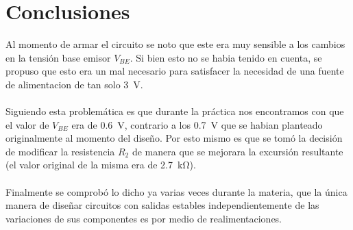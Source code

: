 \documentclass[a4paper,12pt]{article}
\newcommand{\mR}[1]{\SI{#1}{\kilo\ohm}}
\newcommand{\mV}[1]{\SI{#1}{\volt}}
\begin{document}
\section{Conclusiones}
    Al momento de armar el circuito se noto que este era muy sensible a los cambios en la tensión base emisor $V_{BE}$. 
    Si bien esto no se habia tenido en cuenta, se propuso que esto era un mal necesario para satisfacer la necesidad de una fuente
    de alimentacion de tan solo \mV{3}. 
    \\ \\
    Siguiendo esta problemática es que durante la práctica nos encontramos con que el valor de $V_{BE}$ era de \mV{0.6}, contrario a los
    \mV{0.7} que se habian planteado originalmente al momento del diseño. Por esto mismo es que se tomó la decisión de modificar la
    resistencia $R_2$ de manera que se mejorara la excursión resultante (el valor original de la misma era de \mR{2.7}).
    \\ \\
    Finalmente se comprobó lo dicho ya varias veces durante la materia, que la única manera de diseñar circuitos con salidas estables
    independientemente de las variaciones de sus componentes es por medio de realimentaciones.
\end{document}
